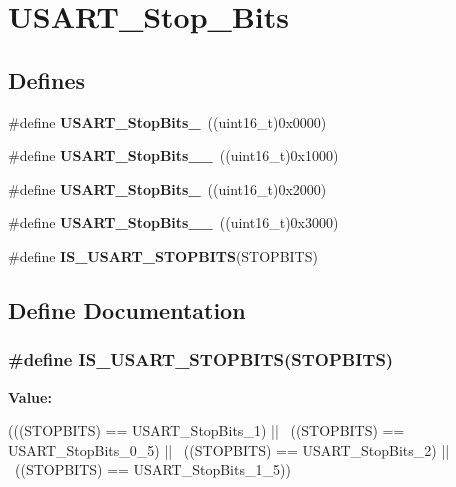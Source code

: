 \hypertarget{group__USART__Stop__Bits}{
\section{USART\_\-Stop\_\-Bits}
\label{group__USART__Stop__Bits}
}
\subsection*{Defines}
\begin{DoxyCompactItemize}
\item 
\hypertarget{group__USART__Stop__Bits_gae2cb35620ba001f0d63e9e0be93e4a05}{
\#define {\bfseries USART\_\-StopBits\_}~((uint16\_\-t)0x0000)}
\label{group__USART__Stop__Bits_gae2cb35620ba001f0d63e9e0be93e4a05}

\item 
\hypertarget{group__USART__Stop__Bits_ga2ad06e3acfb691735d05ab9a314e2e32}{
\#define {\bfseries USART\_\-StopBits\_\_}~((uint16\_\-t)0x1000)}
\label{group__USART__Stop__Bits_ga2ad06e3acfb691735d05ab9a314e2e32}

\item 
\hypertarget{group__USART__Stop__Bits_ga652058b6be2f48ac0d82d0e75537fc81}{
\#define {\bfseries USART\_\-StopBits\_}~((uint16\_\-t)0x2000)}
\label{group__USART__Stop__Bits_ga652058b6be2f48ac0d82d0e75537fc81}

\item 
\hypertarget{group__USART__Stop__Bits_ga30897cc46d5b3790a9b14ffaba354527}{
\#define {\bfseries USART\_\-StopBits\_\_}~((uint16\_\-t)0x3000)}
\label{group__USART__Stop__Bits_ga30897cc46d5b3790a9b14ffaba354527}

\item 
\#define {\bfseries IS\_\-USART\_\-STOPBITS}(STOPBITS)
\end{DoxyCompactItemize}


\subsection{Define Documentation}
\hypertarget{group__USART__Stop__Bits_ga6f9153c1fbee1058ba26ec88f0f20828}{
\subsubsection[{IS\_\-USART\_\-STOPBITS}]{\setlength{\rightskip}{0pt plus 5cm}\#define IS\_\-USART\_\-STOPBITS(STOPBITS)}}
\label{group__USART__Stop__Bits_ga6f9153c1fbee1058ba26ec88f0f20828}
{\bfseries Value:}
\begin{DoxyCode}
(((STOPBITS) == USART_StopBits_1) || \
                                     ((STOPBITS) == USART_StopBits_0_5) || \
                                     ((STOPBITS) == USART_StopBits_2) || \
                                     ((STOPBITS) == USART_StopBits_1_5))
\end{DoxyCode}

